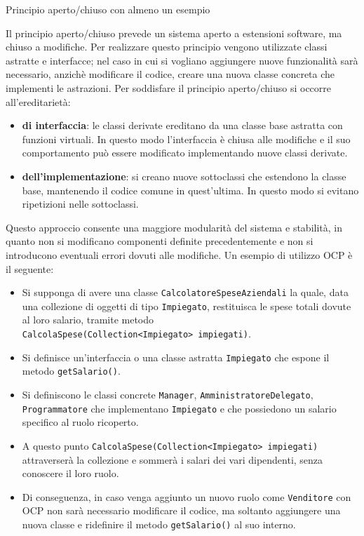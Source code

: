 \begin{problem}{1.14}
Principio aperto/chiuso con almeno un esempio
\end{problem}
\begin{solution}
Il principio aperto/chiuso prevede un sistema aperto a estensioni software, ma chiuso a modifiche.
\newline
Per realizzare questo principio vengono utilizzate classi astratte e interfacce; nel caso in cui si vogliano aggiungere nuove funzionalità sarà necessario, anzichè modificare il codice, creare una nuova classe concreta che implementi le astrazioni.
\newline
Per soddisfare il principio aperto/chiuso si occorre all’ereditarietà:
\begin{itemize}
	\item \textbf{di interfaccia}: le classi derivate ereditano da una classe base astratta con
	funzioni virtuali. In questo modo l’interfaccia è chiusa alle modifiche e il suo comportamento può
	essere modificato implementando nuove classi derivate.
	\item \textbf{dell’implementazione}: si creano nuove sottoclassi che estendono la classe base, mantenendo il codice comune in quest'ultima.
	\newline
	In questo modo si evitano ripetizioni nelle sottoclassi.
\end{itemize}


Questo approccio consente una maggiore modularità del sistema e stabilità, in quanto non si modificano componenti definite precedentemente e non si introducono eventuali errori dovuti alle modifiche.
Un esempio di utilizzo OCP è il seguente:
\begin{itemize}
	\item Si supponga di avere una classe \texttt{CalcolatoreSpeseAziendali} la quale, data una collezione di oggetti di tipo \texttt{Impiegato}, restituisca le spese totali dovute al loro salario, tramite metodo\\ \texttt{CalcolaSpese(Collection<Impiegato> impiegati)}.
	\item Si definisce un'interfaccia o una classe astratta \texttt{Impiegato} che espone il metodo \texttt{getSalario()}.
	\item Si definiscono le classi concrete \texttt{Manager}, \texttt{AmministratoreDelegato}, \texttt{Programmatore} che implementano \texttt{Impiegato} e che possiedono un salario specifico al ruolo ricoperto.
	\item A questo punto \texttt{CalcolaSpese(Collection<Impiegato> impiegati)} attraverserà la collezione e sommerà i salari dei vari dipendenti, senza conoscere il loro ruolo.
	\item Di conseguenza, in caso venga aggiunto un nuovo ruolo come \texttt{Venditore} con OCP non sarà necessario modificare il codice, ma soltanto aggiungere una nuova classe e ridefinire il metodo \texttt{getSalario()} al suo interno.
\end{itemize}
\end{solution}


